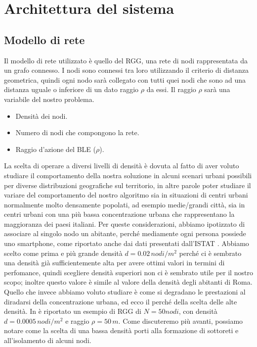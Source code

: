 \chapter{Architettura del sistema}
\label{chap:architettura}

\section{Modello di rete}
\label{sec:modello_rete}
Il modello di rete utilizzato è quello del \acf{RGG}, una rete di nodi rappresentata da un grafo connesso. I nodi sono connessi tra loro utilizzando il criterio di distanza geometrica, quindi ogni nodo sarà collegato con tutti quei nodi che sono ad una distanza uguale o inferiore di un dato raggio $\rho$ da essi. Il raggio $\rho$ sarà una variabile del nostro problema. \medskip

\begin{itemize}
	\item Densità dei nodi.
	\item Numero di nodi che compongono la rete.
	\item Raggio d'azione del \acs{BLE} (\textit{$\rho$}).
\end{itemize}
La scelta di operare a diversi livelli di densità è dovuta al fatto di aver voluto studiare il comportamento della nostra soluzione in alcuni scenari urbani possibili per diverse distribuzioni geografiche sul territorio, in altre parole poter studiare il variare del comportamento del nostro algoritmo sia in situazioni di centri urbani normalmente molto densamente popolati, ad esempio medie/grandi città, sia in centri urbani con una più bassa concentrazione urbana che rappresentano la maggioranza dei paesi italiani.
Per queste considerazioni, abbiamo ipotizzato di associare al singolo nodo un abitante, perché mediamente ogni persona possiede uno smartphone, come riportato anche dai dati presentati dall'ISTAT \cite{istat2014}. Abbiamo scelto come prima e più grande densità $ d=0.02\,nodi/m^2$ perché ci è sembrato una densità già sufficientemente alta per avere ottimi valori in termini di perfomance, quindi scegliere densità superiori non ci è sembrato utile per il nostro scopo; inoltre questo valore è simile al valore della densità degli abitanti di Roma. Quello che invece abbiamo voluto studiare è come si degradano le prestazioni al diradarsi della concentrazione urbana, ed ecco il perché della scelta delle alte densità. In  è riportato un esempio di RGG di $ N=50 nodi$, con densità $ d=0.0005\,nodi/m^2$ e raggio $ \rho=50\,m $. Come discuteremo più avanti, possiamo notare come la scelta di una bassa densità porti alla formazione di sottoreti e all'isolamento di alcuni nodi.
\medskip

